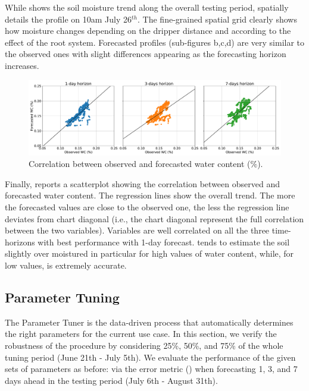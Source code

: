 While  shows the soil moisture trend along the overall testing period,  spatially details the profile on 10am July 26$^{th}$. The fine-grained spatial grid clearly shows how moisture changes depending on the dripper distance and according to the effect of the root system.
%
Forecasted profiles (sub-figures b,c,d) are very similar to the observed ones with slight differences appearing as the forecasting horizon increases.
\begin{figure}[t]
    \centering
    \includegraphics[scale=.27]{chapters/physics-aware/orchard/img/correlation_wc.pdf}
    \caption{Correlation between observed and forecasted  water content ($\%$).}
    \label{orchard-fig:scatter_correlation}
\end{figure}

Finally,  reports a scatterplot showing the correlation between observed and forecasted water content.
%
The regression lines show the overall trend.
%
The more the forecasted values are close to the observed one, the less the regression line deviates from chart diagonal (i.e., the chart diagonal represent the full correlation between the two variables). Variables are well correlated on all the three time-horizons with best performance with 1-day forecast.
%
\olab{} tends to estimate the soil slightly over moistured in particular for high values of water content, while, for low values, \olab{} is extremely accurate.


\subsection{Parameter Tuning}

The Parameter Tuner is the data-driven process that automatically determines the right parameters for the current use case. 
%
In this section, we verify the robustness of the procedure 
by considering 25\%, 50\%, and 75\% of the whole tuning period (June 21th - July 5th).
%
We evaluate the performance of the given sets of parameters as before: via the error metric () when forecasting 1, 3, and 7 days ahead in the testing period (July 6th - August 31th).

